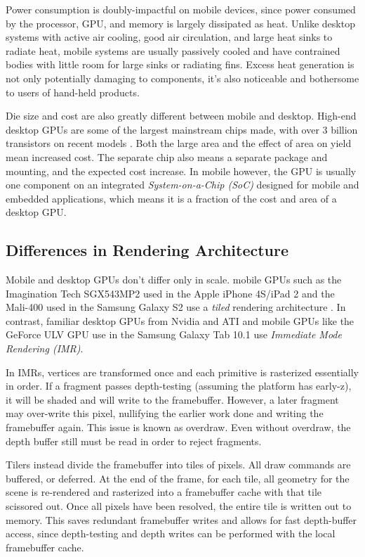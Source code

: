 Power consumption is doubly-impactful on mobile devices, since power consumed
by the processor, GPU, and memory is largely dissipated as heat.  Unlike
desktop systems with active air cooling, good air circulation, and large heat
sinks to radiate heat, mobile systems are usually passively cooled and have
contrained bodies with little room for large sinks or radiating fins.  Excess
heat generation is not only potentially damaging to components, it's also
noticeable and bothersome to users of hand-held products.

Die size and cost are also greatly different between mobile and desktop.
High-end desktop GPUs are some of the largest mainstream chips made, with over
3 billion transistors on recent models \cite{Walton10}.  Both the large area
and the effect of area on yield mean increased cost.  The separate chip also
means a separate package and mounting, and the expected cost increase.  In
mobile however, the GPU is usually one component on an integrated
\textit{System-on-a-Chip (SoC)} designed for mobile and embedded applications,
which means it is a fraction of the cost and area of a desktop GPU.

\subsection{Differences in Rendering
Architecture}\label{Jon-McCaffrey:differences-in-rendering-architecture}
  Mobile and desktop GPUs don't
differ only in scale.  mobile GPUs such as the Imagination Tech SGX543MP2 used
in the Apple iPhone 4S/iPad 2 and the Mali-400 used in the Samsung Galaxy S2
use a \textit{tiled} rendering architecture \cite{anandtech_galaxys2}.  In
contrast, familiar desktop GPUs from Nvidia and ATI and mobile GPUs like the
GeForce ULV GPU use in the Samsung Galaxy Tab 10.1 use \textit{Immediate Mode
Rendering (IMR)}.

In IMRs, vertices are transformed once and each primitive is rasterized
essentially in order.  If a fragment passes depth-testing (assuming the
platform has early-z), it will be shaded and will write to the framebuffer.
However, a later fragment may over-write this pixel, nullifying the earlier
work done and writing the framebuffer again.  This issue is known as overdraw.
Even without overdraw, the depth buffer still must be read in order to reject
fragments.

Tilers instead divide the framebuffer into tiles of pixels.  All draw commands
are buffered, or deferred.  At the end of the frame, for each tile, all
geometry for the scene is re-rendered and rasterized into a framebuffer cache
with that tile scissored out.  Once all pixels have been resolved, the entire
tile is written out to memory.  This saves redundant framebuffer writes and
allows for fast depth-buffer access, since depth-testing and depth writes can
be performed with the local framebuffer cache.

